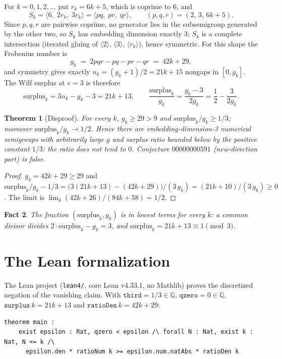 \documentclass[11pt]{article}
\newtheorem{theorem}{Theorem}
\newtheorem{fact}[theorem]{Fact}
\theoremstyle{definition}
\begin{document}
For $k=0,1,2,\dots$ put $r_k=6k+5$, which is coprime to $6$, and
\[
S_k=\langle 6,\;2r_k,\;3r_k\rangle=\langle pq,\;pr,\;qr\rangle,
\qquad (p,q,r)=(2,\,3,\,6k+5).
\]
Since $p,q,r$ are pairwise coprime, no generator lies in the subsemigroup
generated by the other two, so $S_k$ has embedding dimension exactly $3$; $S_k$
is a complete intersection (iterated gluing of $\langle 2\rangle$, $\langle 3\rangle$,
$\langle r_k\rangle$), hence symmetric. For this shape the Frobenius number is
\[
g_k \;=\; 2pqr-pq-pr-qr \;=\; 42k+29,
\]
and symmetry gives exactly $n_k=(g_k+1)/2=21k+15$ nongaps in $[0,g_k]$. The
Wilf surplus at $e=3$ is therefore
\[
\mathrm{surplus}_k = 3n_k-g_k-3 = 21k+13,
\qquad
\frac{\mathrm{surplus}_k}{g_k} = \frac{g_k-3}{2g_k} = \frac12-\frac{3}{2g_k}.
\]

\begin{theorem}[Disproof]\label{thm:main}
For every $k$, $g_k\ge 29>9$ and
$\mathrm{surplus}_k/g_k\ge 1/3$; moreover $\mathrm{surplus}_k/g_k\to 1/2$.
Hence there are embedding-dimension-3 numerical semigroups with arbitrarily
large $g$ and surplus ratio bounded below by the positive constant $1/3$: the
ratio does not tend to $0$. Conjecture $00000000591$ (new-direction part) is
false.
\end{theorem}

\begin{proof}
$g_k = 42k+29 \ge 29$ and
$\mathrm{surplus}_k/g_k-1/3 = \bigl(3(21k+13)-(42k+29)\bigr)/(3\,g_k)
= (21k+10)/(3\,g_k) \ge 0$. The limit is
$\lim_k (42k+26)/(84k+58) = 1/2$.
\end{proof}

\begin{fact}
The fraction $(\mathrm{surplus}_k, g_k)$ is in lowest terms for every $k$: a
common divisor divides $2\cdot\mathrm{surplus}_k-g_k=3$, and
$\mathrm{surplus}_k=21k+13\equiv 1 \pmod 3$.
\end{fact}

\section{The Lean formalization}

The Lean project (\texttt{lean4/}, core Lean v4.33.1, no Mathlib) proves the
discretized negation of the vanishing claim. With
$\texttt{third}=1/3\in\mathbb{Q}$, $\texttt{qzero}=0\in\mathbb{Q}$,
$\texttt{surplus}\ k = 21k+13$ and $\texttt{ratioDen}\ k = 42k+29$:

\begin{verbatim}
theorem main :
    exist epsilon : Rat, qzero < epsilon /\ forall N : Nat, exist k : Nat, N <= k /\
      epsilon.den * ratioNum k >= epsilon.num.natAbs * ratioDen k
\end{verbatim}
\end{document}
